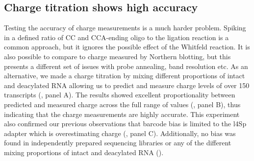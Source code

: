 \documentclass[9pt,lineno]{elife}
\begin{document}
\begin{figure}[ht!]
\label{figsupp:f4S2}
\end{figure}






\subsection{Charge titration shows high accuracy}
Testing the accuracy of charge measurements is a much harder problem.
Spiking in a defined ratio of CC and CCA-ending oligo to the ligation reaction is a common approach, but it ignores the possible effect of the Whitfeld reaction.
It is also possible to compare to charge measured by Northern blotting, but this presents a different set of issues with probe annealing, band resolution etc.
As an alternative, we made a charge titration by mixing different proportions of intact and deacylated RNA allowing us to predict and measure charge levels of over 150 transcripts (, panel A).
The results showed excellent proportionality between predicted and measured charge across the full range of values (, panel B), thus indicating that the charge measurements are highly accurate.
This experiment also confirmed our previous observations that barcode bias is limited to the l4Sp adapter which is overestimating charge (, panel C).
Additionally, no bias was found in independently prepared sequencing libraries or any of the different mixing proportions of intact and deacylated RNA ().
\end{document}
